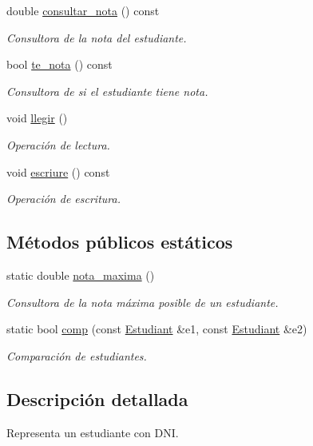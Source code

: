 \begin{DoxyCompactItemize}
double \hyperlink{class_estudiant_a21afbb59cddf87258d600df04ab95397}{consultar\+\_\+nota} () const
\begin{DoxyCompactList}\small\item\em Consultora de la nota del estudiante. \end{DoxyCompactList}\item 
bool \hyperlink{class_estudiant_a81f265e635e1fe198867a5b594359e1b}{te\+\_\+nota} () const
\begin{DoxyCompactList}\small\item\em Consultora de si el estudiante tiene nota. \end{DoxyCompactList}\item 
void \hyperlink{class_estudiant_af5c4883975828647dfb5ffc6735740e6}{llegir} ()
\begin{DoxyCompactList}\small\item\em Operación de lectura. \end{DoxyCompactList}\item 
void \hyperlink{class_estudiant_aa9a1736c5b133c65d0e9ba299bb41de5}{escriure} () const
\begin{DoxyCompactList}\small\item\em Operación de escritura. \end{DoxyCompactList}\end{DoxyCompactItemize}
\subsection*{Métodos públicos estáticos}
\begin{DoxyCompactItemize}
\item 
static double \hyperlink{class_estudiant_a5df5eed414c87a2a1c2efa4194633afd}{nota\+\_\+maxima} ()
\begin{DoxyCompactList}\small\item\em Consultora de la nota máxima posible de un estudiante. \end{DoxyCompactList}\item 
static bool \hyperlink{class_estudiant_a5f19b7f7436e8c12a13159335040ae42}{comp} (const \hyperlink{class_estudiant}{Estudiant} \&e1, const \hyperlink{class_estudiant}{Estudiant} \&e2)
\begin{DoxyCompactList}\small\item\em Comparación de estudiantes. \end{DoxyCompactList}\end{DoxyCompactItemize}


\subsection{Descripción detallada}
Representa un estudiante con D\+NI. 


